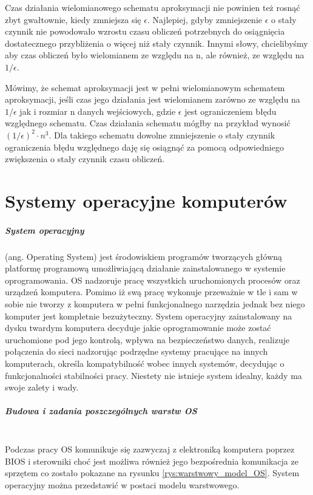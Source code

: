 \documentclass[a4paper,twoside]{report}
\begin{document}
Czas działania wielomianowego schematu aproksymacji nie powinien też rosnąć zbyt gwałtownie, kiedy zmniejsza się $\epsilon$. Najlepiej, gdyby zmniejszenie  $\epsilon$ o stały czynnik nie powodowało wzrostu czasu obliczeń potrzebnych do osiągnięcia dostatecznego przybliżenia o więcej niż stały czynnik. Innymi słowy, chcielibyśmy aby czas obliczeń było wielomianem ze względu na n, ale również, ze względu na $1/\epsilon$.

Mówimy, że schemat aproksymacji jest w pełni wielomianowym schematem aproksymacji, jeśli czas jego działania jest wielomianem zarówno ze względu na $1/\epsilon$ jak i rozmiar n danych wejściowych, gdzie $\epsilon$ jest ograniczeniem błędu względnego schematu. Czas działania schematu mógłby na przykład wynosić $ (1/\epsilon)^2 \cdot n^3 $. Dla takiego schematu dowolne zmniejszenie o stały czynnik ograniczenia błędu względnego daję się osiągnąć za pomocą odpowiedniego zwiększenia o stały czynnik czasu obliczeń.



\chapter{Systemy operacyjne komputerów}

\paragraph{System operacyjny}
(ang. Operating System) jest środowiskiem programów tworzących główną platformę programową umożliwiającą działanie zainstalowanego w systemie oprogramowania. OS nadzoruje pracę wszystkich uruchomionych procesów oraz urządzeń komputera. Pomimo iż swą pracę wykonuje przeważnie w tle i sam w sobie nie tworzy z komputera w pełni funkcjonalnego narzędzia jednak bez niego komputer jest kompletnie bezużyteczny. System operacyjny zainstalowany na dysku twardym komputera decyduje jakie oprogramowanie może zostać uruchomione pod jego kontrolą, wpływa na bezpieczeństwo danych, realizuje połączenia do sieci nadzorując podrzędne systemy pracujące na innych komputerach, określa kompatybilność wobec innych systemów, decydując o funkcjonalności stabilności pracy. Niestety nie istnieje system idealny, każdy ma swoje zalety i wady.

\paragraph{Budowa i zadania poszczególnych warstw OS\\\\}
Podczas pracy OS komunikuje się zazwyczaj z elektroniką komputera poprzez BIOS i sterowniki choć jest możliwa również jego bezpośrednia komunikacja ze sprzętem co zostało pokazane na rysunku \ref{rys:warstwowy_model_OS}. System operacyjny można przedstawić w postaci modelu warstwowego.
\end{document}

